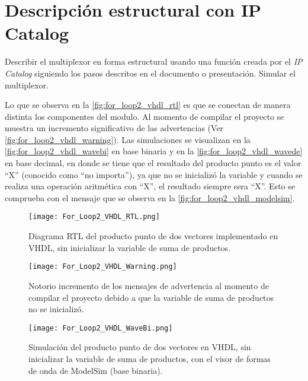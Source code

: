 \section{Descripción estructural con IP Catalog \label{sec:s2}}

\begin{center}
	\begin{minipage}{12cm}
		\begin{tcolorbox}[title=Actividad 2]
			Describir el multiplexor en forma estructural usando una función creada por el \textit{IP Catalog} siguiendo los pasos descritos en el documento o presentación. Simular el multiplexor.
		\end{tcolorbox}	
	\end{minipage}
\end{center}

Lo que se observa en la \autoref{fig:for_loop2_vhdl_rtl} es que se conectan de manera distinta los componentes del modulo. Al momento de compilar el proyecto se muestra un incremento significativo de las advertencias (Ver \autoref{fig:for_loop2_vhdl_warning}). Las simulaciones se visualizan en la \autoref{fig:for_loop2_vhdl_wavebi} en base binaria y en la \autoref{fig:for_loop2_vhdl_wavede} en base decimal, en donde se tiene que el resultado del producto punto es el valor ``X'' (conocido como ``no importa''), ya que no se inicializó la variable y cuando se realiza una operación aritmética con ``X'', el resultado siempre sera ``X''. Esto se comprueba con el mensaje que se observa en la \autoref{fig:for_loop2_vhdl_modelsim}.

\begin{figure}[ht]
	\centering
	\texttt{[image: For\_Loop2\_VHDL\_RTL.png]}
	\caption{Diagrama RTL del producto punto de dos vectores implementado en VHDL, sin inicializar la variable de suma de productos. \label{fig:for_loop2_vhdl_rtl}}
\end{figure}

\begin{figure}[ht]
	\centering
	\texttt{[image: For\_Loop2\_VHDL\_Warning.png]}
	\caption{Notorio incremento de los mensajes de advertencia al momento de compilar el proyecto debido a que la variable de suma de productos no se inicializó. \label{fig:for_loop2_vhdl_warning}}
\end{figure}

\begin{figure}[ht]
	\centering
	\texttt{[image: For\_Loop2\_VHDL\_WaveBi.png]}
	\caption{Simulación del producto punto de dos vectores en VHDL, sin inicializar la variable de suma de productos, con el visor de formas de onda de ModelSim (base binaria). \label{fig:for_loop2_vhdl_wavebi}}
\end{figure}

